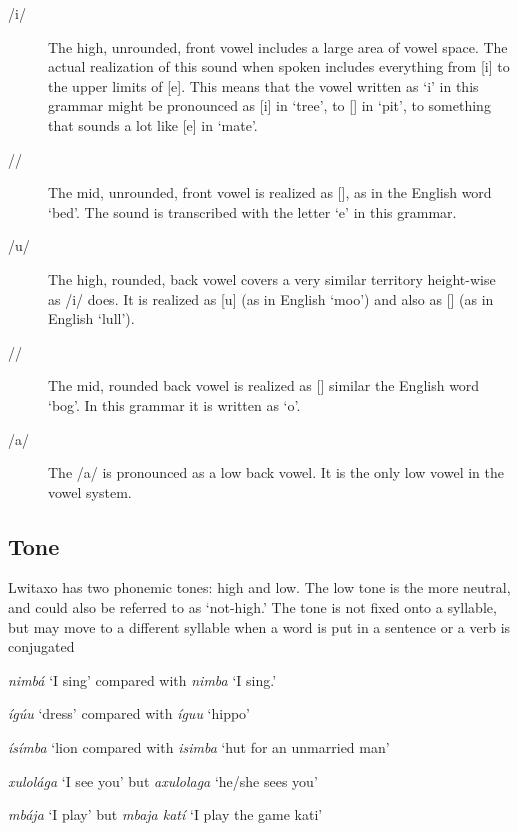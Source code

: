 \begin{description}
\item[/i/] The high, unrounded, front vowel includes a large area of vowel space.  The actual realization of this sound when spoken includes everything from [i] to the upper limits of [e].  This means that the vowel written as `i' in this grammar might be pronounced as [i] in `tree', to [\openi] in `pit', to something that sounds a lot like [e] in `mate'.

\item[/\epsilon{}/] The mid, unrounded, front vowel is realized as [\epsilon{}], as in the English word `bed'.  The sound is transcribed with the letter `e' in this grammar.

\item[/u/]  The high, rounded, back vowel covers a very similar territory height-wise as /i/ does.  It is realized as [u] (as in English `moo') and also as [\openu{}] (as in English `lull').

\item[/\openo{}/] The mid, rounded back vowel is realized as [\openo] similar the English word `bog'.  In this grammar it is written as `o'.

\item[/a/] The /a/ is pronounced as a low back vowel.  It is the only low vowel in the vowel system.
\end{description}

\subsection{Tone}

Lwitaxo has two phonemic tones: high and low.  The low tone is the more neutral, and could also be referred to as `not-high.'  The tone is not fixed onto a syllable, but may move to a different syllable when a word is put in a sentence or a verb is conjugated

\begin{wrdex}
\item \emph{nimb\'a} `I sing' compared with \emph{nimba} `I sing.'
\item \emph{í\engma{}g\'u\beta{}u} `dress' compared with \emph{í\engma{}gu\beta{}u} `hippo'
\item \emph{ísímba} `lion compared with \emph{isimba} `hut for an unmarried man'
\item \emph{xulol\'a\engma{}ga} `I see you' but \emph{axulola\engma{}ga} `he/she sees you'
\item \emph{mb\'aja} `I play' but \emph{mbaja katí} `I play the game kati'
\end{wrdex}

